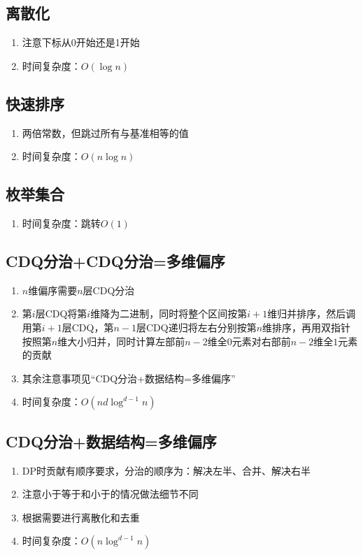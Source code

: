 \documentclass[twocolumn,a4,8pt]{article}  %
\begin{document}
	 	\subsection{离散化}
			\noindent\begin{enumerate}
				\item 注意下标从0开始还是1开始
				\item 时间复杂度：$O(\log n)$
			\end{enumerate}
	 	 	
	 	 	
	 	\subsection{快速排序}
			\noindent\begin{enumerate}
				\item 两倍常数，但跳过所有与基准相等的值
				\item 时间复杂度：$O(n\log n)$
			\end{enumerate}
	 	 	
	 	 	
 	 	\subsection{枚举集合}
			\noindent\begin{enumerate}
				\item 时间复杂度：跳转$O(1)$
			\end{enumerate}
	 	 	
	 	 	
	 	\subsection{CDQ分治+CDQ分治=多维偏序}
			\noindent\begin{enumerate}
				\item $n$维偏序需要$n$层CDQ分治
				\item 第$i$层CDQ将第$i$维降为二进制，同时将整个区间按第$i+1$维归并排序，然后调用第$i+1$层CDQ，第$n-1$层CDQ递归将左右分别按第$n$维排序，再用双指针按照第$n$维大小归并，同时计算左部前$n-2$维全$0$元素对右部前$n-2$维全$1$元素的贡献
				\item 其余注意事项见“CDQ分治+数据结构=多维偏序”
				\item 时间复杂度：$O(nd\log^{d-1}n)$
			\end{enumerate}
	 	 	

		\subsection{CDQ分治+数据结构=多维偏序}
			\noindent\begin{enumerate}
				\item DP时贡献有顺序要求，分治的顺序为：解决左半、合并、解决右半
				\item 注意小于等于和小于的情况做法细节不同
				\item 根据需要进行离散化和去重
				\item 时间复杂度：$O(n\log^{d-1}n)$
			\end{enumerate}
	 	 	
	
\end{document}
